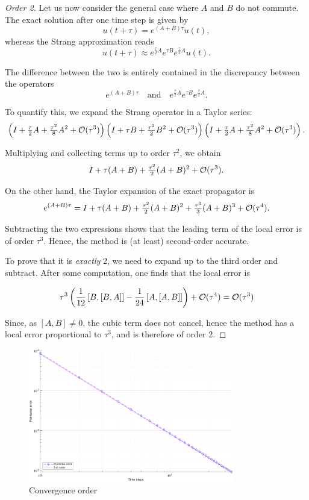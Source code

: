 \begin{proof}[Order 2]
    Let us now consider the general case where $A$ and $B$ do not commute. 
    The exact solution after one time step is given by
    \[
        u(t+\tau) = e^{(A+B)\tau} u(t),
    \]
    whereas the Strang approximation reads
    \[
        u(t+\tau) \approx e^{\frac{\tau}{2}A} e^{\tau B} e^{\frac{\tau}{2}A} u(t).
    \]

    The difference between the two is entirely contained in the discrepancy between the operators
    \[
        e^{(A+B)\tau} \quad \text{and} \quad e^{\frac{\tau}{2}A} e^{\tau B} e^{\frac{\tau}{2}A}.
    \]

    To quantify this, we expand the Strang operator in a Taylor series:
    \[
        \left( I + \tfrac{\tau}{2}A + \tfrac{\tau^2}{8}A^2 + \mathcal{O}(\tau^3) \right)
        \left( I + \tau B + \tfrac{\tau^2}{2}B^2 + \mathcal{O}(\tau^3) \right)
        \left( I + \tfrac{\tau}{2}A + \tfrac{\tau^2}{8}A^2 + \mathcal{O}(\tau^3) \right).
    \]

    Multiplying and collecting terms up to order $\tau^2$, we obtain
    \[
        I + \tau(A+B) + \tfrac{\tau^2}{2}(A+B)^2 + \mathcal{O}(\tau^3).
    \]

    On the other hand, the Taylor expansion of the exact propagator is
    \[
        e^{(A+B)\tau} = I + \tau(A+B) + \tfrac{\tau^2}{2}(A+B)^2 + \tfrac{\tau^3}{3}(A+B)^3 + \mathcal{O}(\tau^4).
    \]

    Subtracting the two expressions shows that the leading term of the local error is of order $\tau^3$. Hence, the method is (at least) second-order accurate.

    To prove that it is \emph{exactly} 2, we need to expand up to the third order and subtract. After some computation, one finds that the local error is 

    \[
        \tau^3 \left( \frac{1}{12}\left[B, \left[B, A\right]\right] - \frac{1}{24} \left[A, \left[A,B\right]\right]\right) + \mathcal{O}(\tau^4) = \mathcal{O}(\tau^3)
    \]

    Since, as $[A,B] \neq 0$, the cubic term does not cancel, hence the method has a local error proportional to $\tau^3$, and is therefore of order 2.
\end{proof}

\begin{figure}
    \centering
    \includegraphics[width=0.8\textwidth]{img/time_conv.pdf}
    \caption{Convergence order}
\end{figure}


